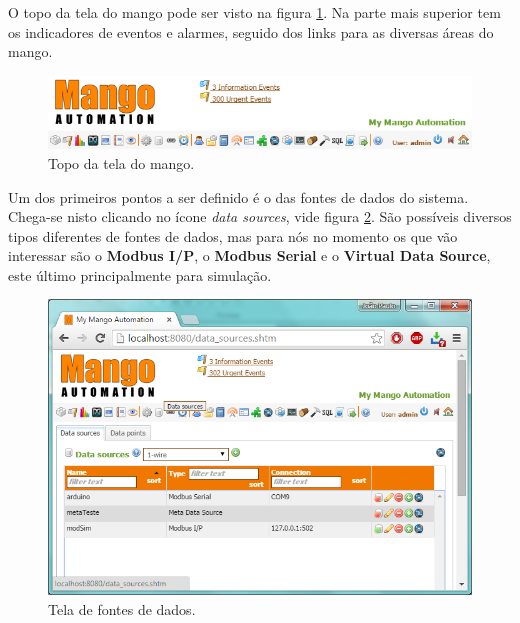 O topo da tela do mango pode ser visto na figura \ref{fig:mango_topo}. Na parte mais superior tem os indicadores de eventos e alarmes, seguido dos links para as diversas áreas do mango.
\begin{figure}[hbt]
	\begin{center}
		\includegraphics[width=\textwidth]{figuras/mango_topo}
	\end{center}
	\caption{Topo da tela do mango.}
	\label{fig:mango_topo}
\end{figure}

Um dos primeiros pontos a ser definido é o das fontes de dados do sistema. Chega-se nisto clicando no ícone \emph{data sources}, vide figura \ref{fig:mango_sources}. São possíveis diversos tipos diferentes de fontes de dados, mas para nós no momento os que vão interessar são o \textbf{Modbus I/P}, o \textbf{Modbus Serial} e o \textbf{Virtual Data Source}, este último principalmente para simulação.
\begin{figure}[hbt]
	\begin{center}
		\includegraphics[width=\textwidth]{figuras/mango_sources}
	\end{center}
	\caption{Tela de fontes de dados.}
	\label{fig:mango_sources}
\end{figure}

